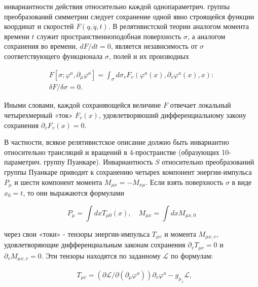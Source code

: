 \documentclass[10pt]{article}
\begin{document}
инвариантности действия относительно каждой однопараметрич. группы преобразований симметрии следует сохранение одной явно строящейся функции координат и скоростей $F(q, \dot{q}, t)$. В релятивистской теории аналогом момента времени $t$ служит пространственноподобная поверхность $\sigma$, а аналогом сохранения во времени, $d F / d t=0$, является независимость от $\sigma$ соответствующего функционала $\sigma$, полей и их производных



\[

\begin{gathered}

F\left[\sigma ; \varphi^{a}, \partial_{\mu} \varphi^{a}\right]=\int_{\sigma} d \sigma_{v} F_{v}\left(\varphi^{a}(x), \partial_{v} \varphi^{a}(x), x\right): \\

\delta F / \delta \sigma=0 .

\end{gathered}

\]



Иными словами, каждой сохраняющейся величине $F$ отвечает локальный четырехмерный «ток» $F_{v}(x)$, удовлетворяюший дифференциальному закону сохранения $\partial_{v} F_{v}(x)=0$.



В частности, всякое релятивистское описание должно быть инвариантно относительно трансляций и вращений в 4-пространстве (образующих 10-параметрич. группу Пуанкаре). Инвариантность $S$ относительно преобразований группы Пуанкаре приводит к сохранению четырех компонент энергии-импульса $P_{\mu}$ и шести компонент момента $M_{\mu x}=-M_{x \mu}$. Если взять поверхность $\sigma$ в виде $x_{0}=t$, то они выражаются формулами



\[

P_{\mu}=\int d x T_{\mu 0}(x), \quad M_{\mu x}=\int d x M_{\mu x, 0}

\]



через свои «токи» - тензоры энергии-импульса $T_{\mu v}$ и момента $M_{\mu x, v}$, удовлетворяющие дифференциальным законам сохранения $\partial_{v} T_{\mu v}=0$ и $\partial_{v} M_{\mu x, v}=0$. Эти тензоры находятся по заданному $\mathscr{L}$ по формулам:



\[

\begin{aligned}

& T_{\mu v}=\left(\partial \mathscr{L} / \partial\left(\partial_{\mu} \varphi^{a}\right)\right) \partial_{v} \varphi^{a}-g_{\mu_{v}} \mathscr{L},

\end{aligned}

\]
\end{document}
